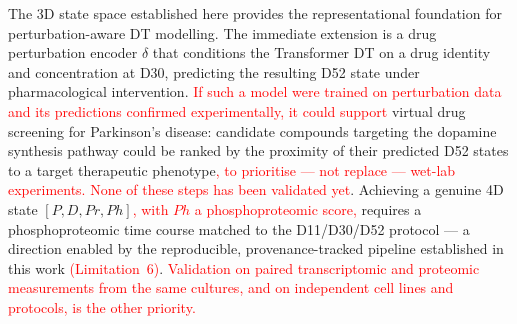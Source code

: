 \documentclass[5p,times,twocolumn]{elsarticle}
\newcommand{\rtag}[1]{}
\newcommand{\rev}[2]{\rtag{#1}\textcolor{red}{#2}}
\newcommand{\lang}[1]{\textcolor{red}{#1}}
\begin{document}
The 3D state space established here provides the representational
foundation for perturbation-aware DT modelling.
The immediate extension is a drug perturbation encoder $\delta$
that conditions the Transformer DT on a drug identity and
concentration at D30, predicting the resulting D52 state under
pharmacological intervention.
\rev{R2.20}{If such a model were trained on perturbation data
  and its predictions confirmed experimentally, it could support}
virtual drug screening for Parkinson's
disease: candidate compounds targeting the dopamine synthesis
pathway could be ranked by the proximity of their predicted D52
states to a target therapeutic phenotype\rev{R2.20}{, to
  prioritise --- not replace --- wet-lab experiments. None of
  these steps has been validated yet}.
Achieving a genuine 4D state $[P, D, Pr, Ph]$\lang{, with $Ph$ a
  phosphoproteomic score,} requires a
phosphoproteomic time course matched to the D11/D30/D52
protocol --- a direction enabled by the reproducible,
provenance-tracked pipeline established in this work
\rev{R1.12}{(Limitation~6)}.
\rev{R2.17,R2.19}{Validation on paired transcriptomic and
  proteomic measurements from the same cultures, and on
  independent cell lines and protocols, is the other priority.}

\end{document}
